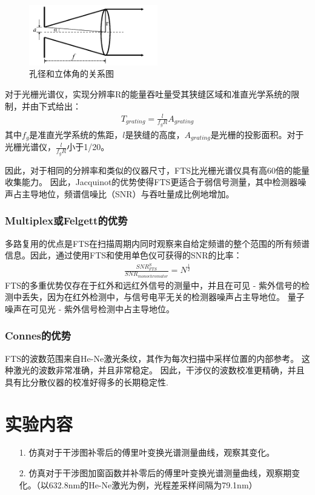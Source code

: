 \documentclass[conference]{IEEEtran}
\begin{document}
\begin{figure}[htbp]
    \centerline{\includegraphics[width=0.5\textwidth]{pic12.png}}
    \caption{孔径和立体角的关系图}
    \label{pic12}
\end{figure}

对于光栅光谱仪，实现分辨率R的能量吞吐量受其狭缝区域和准直光学系统的限制，并由下式给出：
\begin{align}
    T_{grating} = \frac{l}{f_gR}A_{grating}
\end{align}
其中$f_g$是准直光学系统的焦距，$l$是狭缝的高度，$A_{grating}$是光栅的投影面积。对于光栅光谱仪，$\frac{l}{f_gR}$小于1/20。

因此，对于相同的分辨率和类似的仪器尺寸，FTS比光栅光谱仪具有高60倍的能量收集能力。 因此，Jacquinot的优势使得FTS更适合于弱信号测量，其中检测器噪声占主导地位，频谱信噪比（SNR）与吞吐量成比例地增加。

\subsubsection{Multiplex或Felgett的优势} 
多路复用的优点是FTS在扫描周期内同时观察来自给定频谱的整个范围的所有频谱信息。因此，通过使用FTS和使用单色仪可获得的SNR的比率：
\begin{align}
    \frac{SNR^S_{FTS}}{SNR_{monochromator}} = N^{\frac{1}{2}}
\end{align}
FTS的多重优势仅存在于红外和远红外信号的测量中，并且在可见 - 紫外信号的检测中丢失，因为在红外检测中，与信号电平无关的检测器噪声占主导地位。 量子噪声在可见光 - 紫外信号检测中占主导地位。
\subsubsection{Connes的优势}
FTS的波数范围来自He-Ne激光条纹，其作为每次扫描中采样位置的内部参考。 这种激光的波数非常准确，并且非常稳定。 因此，干涉仪的波数校准更精确，并且具有比分散仪器的校准好得多的长期稳定性.


\section{实验内容}
\begin{itemize}
    \item[1.] 仿真对于干涉图补零后的傅里叶变换光谱测量曲线，观察其变化。
    \item[2.] 仿真对于干涉图加窗函数并补零后的傅里叶变换光谱测量曲线，观察期变化。（以632.8nm的He-Ne激光为例，光程差采样间隔为79.1nm）
\end{itemize}
\end{document}
